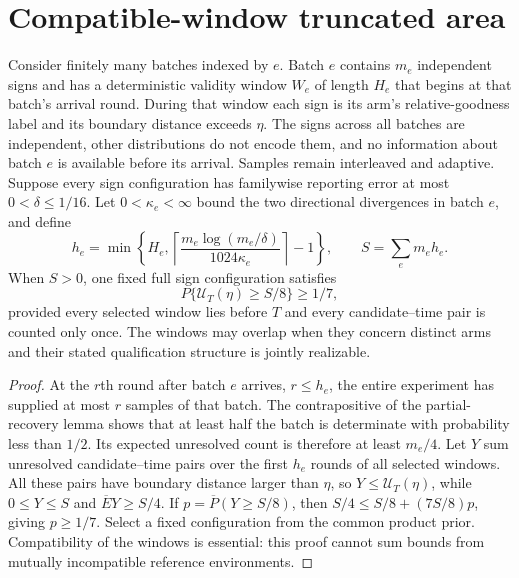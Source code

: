 \section{Compatible-window truncated area}
\label{sec:truncated_extension}

\begin{proposition}
\label{prop:truncated_windows}
Consider finitely many batches indexed by $e$. Batch $e$ contains $m_e$
independent signs and has a deterministic validity window $W_e$ of length
$H_e$ that begins at that batch's arrival round. During that window each sign
is its arm's relative-goodness label and
its boundary distance exceeds $\eta$. The signs across all batches are
independent, other distributions do not encode them, and no information
about batch $e$ is available before its arrival. Samples remain interleaved
and adaptive. Suppose every sign configuration has familywise reporting error
at most $0<\delta\le1/16$. Let $0<\kappa_e<\infty$ bound the two directional
divergences in batch $e$, and define
\[
 h_e=\min\left\{H_e,
 \left\lceil\frac{m_e\log(m_e/\delta)}{1024\kappa_e}\right\rceil-1\right\},
 \qquad S=\sum_e m_eh_e.
\]
When $S>0$, one fixed full sign configuration satisfies
\[
 P\{\mathcal U_T(\eta)\ge S/8\}\ge1/7,
\]
provided every selected window lies before $T$ and every candidate--time pair
is counted only once. The windows may overlap when they concern distinct
arms and their stated qualification structure is jointly realizable.
\end{proposition}
\begin{proof}
At the $r$th round after batch $e$ arrives, $r\le h_e$, the entire experiment
has supplied at most $r$ samples of that batch. The contrapositive of the
partial-recovery lemma shows that at least half the batch is determinate with
probability less than $1/2$. Its expected unresolved count is therefore at
least $m_e/4$. Let $Y$ sum unresolved candidate--time pairs over the first
$h_e$ rounds of all selected windows. All these pairs have boundary distance
larger than $\eta$, so $Y\le\mathcal U_T(\eta)$, while $0\le Y\le S$ and
$\overline EY\ge S/4$. If $p=\overline P(Y\ge S/8)$, then
$S/4\le S/8+(7S/8)p$, giving $p\ge1/7$. Select a fixed configuration from
the common product prior. Compatibility of the windows is essential: this
proof cannot sum bounds from mutually incompatible reference environments.
\end{proof}

